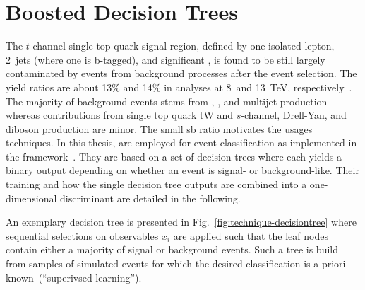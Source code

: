 \section{Boosted Decision Trees}

The $t$-channel single-top-quark signal region, defined by one isolated lepton, 2~jets (where one is b-tagged), and significant \met, is found to be still largely contaminated by events from background processes after the event selection. The  yield ratios are about 13\% and 14\% in analyses at 8~and 13~TeV, respectively~\cite{Khachatryan:2014iya,Sirunyan:2016cdg}. The majority of background events stems from \wjets, \ttbar, and multijet production whereas contributions from single top quark tW and $s$-channel, Drell-Yan, and diboson production are minor. The small \gls{sb} ratio motivates the usages  techniques. In this thesis,  are employed for event classification as implemented in the \TMVA[] framework~\cite{Hocker:2007ht}. They are based on a set of decision trees where each yields a binary output depending on whether an event is signal- or background-like. Their training and how the single decision tree outputs are combined into a one-dimensional discriminant are detailed in the following.

An exemplary decision tree is presented in Fig.~\ref{fig:technique-decisiontree} where sequential selections on observables $x_{i}$ are applied such that the leaf nodes contain either a majority of signal or background events. Such a tree is build from samples of simulated events for which the desired classification is a priori known~(``superivsed learning'').


